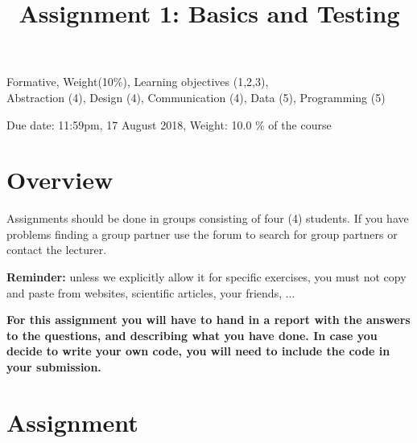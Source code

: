 \documentclass{pracs}
\newcommand{\duedate}{17 August 2018}
\begin{document}
\title{Assignment 1: Basics and Testing}
\maketitle
\thispagestyle{fancy}


	Formative, 	Weight(10\%), 	Learning objectives (1,2,3),\\
 	Abstraction (4), 	Design (4), 	Communication (4), 	Data (5),	Programming (5)




\noindent 

 \begin{center}
    Due date: 11:59pm, \duedate, Weight: 10.0 \% of the course
  \end{center}




\section{Overview}
Assignments should be done in groups consisting of four (4) students.  If you have problems finding a group partner use the forum to search for group partners or contact the lecturer.

\textbf{Reminder:} unless we explicitly allow it for specific exercises, you must not copy and paste from websites, scientific articles, your friends, ...

\textbf{For this assignment you will have to hand in a report with the answers to the questions, and describing what you have done. In case you decide to write your own code,  you will need to include the code in your submission.}



\section{Assignment}
\end{document}
